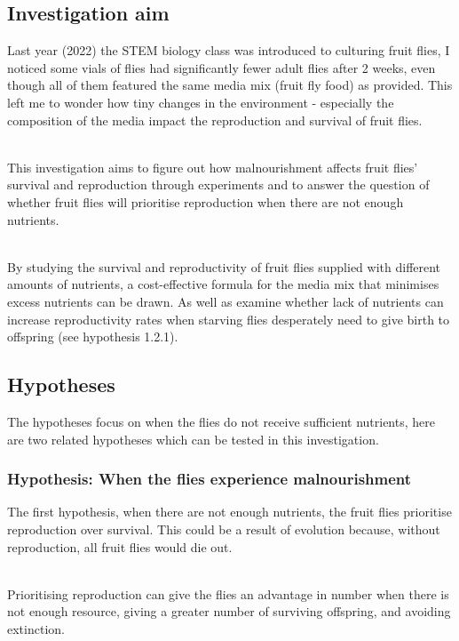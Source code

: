 \documentclass{article}
\begin{document}
\subsection{Investigation aim}

Last year (2022) the STEM biology class was introduced to culturing fruit flies, I noticed some vials of flies had significantly fewer adult flies after 2 weeks, even though all of them featured the same media mix (fruit fly food) as provided. This left me to wonder how tiny changes in the environment - especially the composition of the media impact the reproduction and survival of fruit flies.

\noindent\\
This investigation aims to figure out how malnourishment affects fruit flies' survival and reproduction through experiments and to answer the question of whether fruit flies will prioritise reproduction when there are not enough nutrients.

\noindent\\
By studying the survival and reproductivity of fruit flies supplied with different amounts of nutrients, a cost-effective formula for the media mix that minimises excess nutrients can be drawn. As well as examine whether lack of nutrients can increase reproductivity rates when starving flies desperately need to give birth to offspring (see hypothesis 1.2.1).

\subsection{Hypotheses}

The hypotheses focus on when the flies do not receive sufficient nutrients, here are two related hypotheses which can be tested in this investigation.

\subsubsection{Hypothesis: When the flies experience malnourishment}

The first hypothesis, when there are not enough nutrients, the fruit flies prioritise reproduction over survival. This could be a result of evolution because, without reproduction, all fruit flies would die out.

\noindent\\
Prioritising reproduction can give the flies an advantage in number when there is not enough resource, giving a greater number of surviving offspring, and avoiding extinction.
\end{document}
